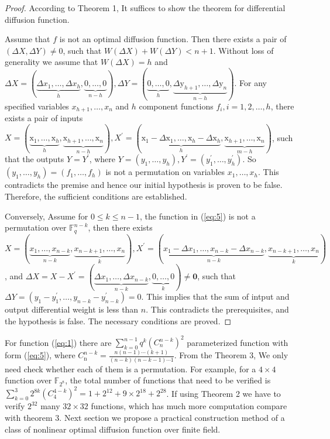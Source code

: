 \documentclass[12pt,a4paper]{article}
\newcommand{\0}{\textbf{0}}
\newcommand{\1}{\textbf{1}}
\newtheorem{proof}{Proof}
\begin{document}
    \begin{proof}
        According to Theorem 1, It suffices to show the theorem for differential diffusion function.

        Assume that $f$ is not an optimal diffusion function. 
        Then there exists a pair of $(\Delta X,\Delta Y)\neq 0$, such that $W(\Delta X)+W(\Delta Y)<n+1$. 
        Without loss of generality we assume that $ W(\Delta X)=h $
        and $\Delta X=(\underbrace{\Delta x_{1}, \ldots, \Delta x_{h}}_{h}, \underbrace{0, \ldots, 0}_{n-h}), \Delta Y=(\underbrace{0, \ldots, 0}_{h}, \underbrace{\Delta \mathrm{y}_{h+1}, \ldots, \Delta \mathrm{y}_{n}}_{n-h})$. 
        For any specified variables $x_{h+1}, \ldots, x_{n}$ and $h$ component functions $f_{i}, i=1,2, \ldots, h$, 
        there exists a pair of inputs $X=(\underbrace{\mathrm{x}_{1}, \ldots, \mathrm{x}_{h}}_{h}, \underbrace{\mathrm{x}_{h+1}, \ldots, \mathrm{x}_{n}}_{n-h}), X^{\prime}=(\underbrace{\mathrm{x}_{1}-\Delta \mathrm{x}_{1}, \ldots, \mathrm{x}_{h}-\Delta \mathrm{x}_{h}}_{h}, \underbrace{\mathrm{x}_{h+1}, \ldots, \mathrm{x}_{n}}_{m-h})$, 
        such that the outputs $Y=Y^{\prime}$, where $Y=\left(y_{1}, \dots, y_{h}\right), Y^{\prime}=\left(y_{1}^{\prime}, \dots, y_{h}^{\prime}\right)$. So $\left(y_{1}, \dots, y_{h}\right)=\left(f_{1}, \dots, f_{h}\right)$ is not a permutation on variables $x_{1}, \ldots, x_{h}$. 
        This contradicts the premise and hence our initial hypothesis is proven to be false. 
        Therefore, the sufficient conditions are established.

        Conversely, Assume for $0 \leq k \leq n-1$, the function in (\ref{eq:5}) is not a permutation over $\mathbb{F}_{q}^{n-k}$, 
        then there  exists $ X=(\underbrace{x_{1}, \ldots, x_{n-k}}_{n-k}, \underbrace{x_{n-k+1}, \ldots, x_{n}}_{k}), X^{\prime}=(\underbrace{x_{1}-\Delta x_{1}, \ldots, x_{n-k}-\Delta x_{n-k}}_{n-k}, \underbrace{x_{n-k+1}, \ldots, x_{n}}_{k})$, 
        and $\Delta X=X-X^{\prime}=(\underbrace{\Delta x_{1}, \ldots, \Delta x_{n-k}}_{n-k}, \underbrace{0, \ldots, 0}_{k}) \neq \mathbf{0}$, 
        such that $\Delta Y=\left(y_{1}-y_{1}^{\prime}, \ldots, y_{n-k}-y_{n-k}^{\prime}\right)=0$. 
        This implies that the sum of intput and output differential weight is less than $n$. 
        This contradicts the prerequisites, and the hypothesis is false. The necessary conditions are proved.
    \end{proof}

    For function (\ref{eq:1}) there are $\sum_{k=0}^{n-1} q^{k}\left(C_{n}^{n-k}\right)^{2}$ parameterized function with form (\ref{eq:5}), 
    where $C_{\mathrm{n}}^{n-k}=\frac{n(n-1) \cdots(k+1)}{(n-k)(n-k-1) \cdots 1}$. 
    From the Theorem 3, We only need check whether each of them is a permutation. 
    For example, for a $4 \times 4$ function over $\mathbb{F}_{2^{8}}$, 
    the total number of functions that need to be verified is $\sum_{k=0}^{3} 2^{8 k}\left(C_{4}^{4-k}\right)^{2}=1+2^{12}+9 \times 2^{18}+2^{28}$. 
    If using Theorem 2 we have to verify $2^{32}$ many $32 \times 32$ functions, which has much more computation compare with theorem 3.
    Next section we propose a practical construction method of a class of nonlinear optimal diffusion function over finite field.
\end{document}
